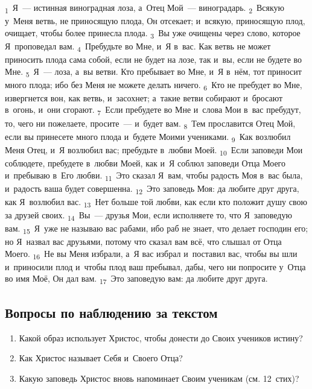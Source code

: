 \documentclass[a4paper,12pt]{article}
\begin{document}
\textsubscript{1}~Я~— истинная виноградная лоза, а~Отец Мой~— виноградарь.
\textsubscript{2}~Всякую у~Меня ветвь, не приносящую плода, Он отсекает; и~всякую, приносящую плод, очищает, чтобы более принесла плода.
\textsubscript{3}~Вы уже очищены через слово, которое Я~проповедал вам.
\textsubscript{4}~Пребудьте во Мне, и~Я в~вас. Как ветвь не может приносить плода сама собой, если не будет на лозе, так и~вы, если не будете во Мне.
\textsubscript{5}~Я~— лоза, а~вы ветви. Кто пребывает во Мне, и~Я в~нём, тот приносит много плода; ибо без Меня не можете делать ничего.
\textsubscript{6}~Кто не пребудет во Мне, извергнется вон, как ветвь, и~засохнет; а~такие ветви собирают и~бросают в~огонь, и~они сгорают.
\textsubscript{7}~Если пребудете во Мне и~слова Мои в~вас пребудут, то, чего ни пожелаете, просите~--- и~будет вам.
\textsubscript{8}~Тем прославится Отец Мой, если вы принесете много плода и~будете Моими учениками.
\textsubscript{9}~Как возлюбил Меня Отец, и~Я возлюбил вас; пребудьте в~любви Моей.
\textsubscript{10}~Если заповеди Мои соблюдете, пребудете в~любви Моей, как и~Я соблюл заповеди Отца Моего и~пребываю в~Его любви.
\textsubscript{11}~Это сказал Я~вам, чтобы радость Моя в~вас была, и~радость ваша будет совершенна.
\textsubscript{12}~Это заповедь Моя: да любите друг друга, как Я~возлюбил вас.
\textsubscript{13}~Нет больше той любви, как если кто положит душу свою за друзей своих.
\textsubscript{14}~Вы~--- друзья Мои, если исполняете то, что Я~заповедую вам.
\textsubscript{15}~Я~уже не называю вас рабами, ибо раб не знает, что делает господин его; но Я~назвал вас друзьями, потому что сказал вам всё, что слышал от Отца Моего.
\textsubscript{16}~Не вы Меня избрали, а~Я вас избрал и~поставил вас, чтобы вы шли и~приносили плод и~чтобы плод ваш пребывал, дабы, чего ни попросите у~Отца во имя Моё, Он дал вам.
\textsubscript{17}~Это заповедую вам: да любите друг друга. 

\subsection*{Вопросы по наблюдению за текстом}
\begin{enumerate}
    \item Какой образ использует Христос, чтобы донести до Своих учеников истину? 
    
    \myline
    
    \myline
    \item Как Христос называет Себя и~Своего Отца? 
    
    \myline
    
    \myline
    \item Какую заповедь Христос вновь напоминает Своим ученикам (см. 12~стих)? 
    
    \myline
    
    \myline
\end{enumerate}
\end{document}
